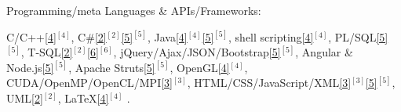 \begin{cventries}

  \cventry
    {Programming/meta Languages \& APIs/Frameworks:} %
    {} %
    {} %
    {} %
    {     
      \begin{cvitems} %
        \item {
        C/C++\ref{4}{$^{[4]}$}, 
        C\#\ref{2}{$^{[2]}$}\ref{5}{$^{[5]}$}, 
        Java\ref{4}{$^{[4]}$}\ref{5}{$^{[5]}$}, 
        shell scripting\ref{4}{$^{[4]}$}, 
        PL/SQL\ref{5}{$^{[5]}$}, 
        T-SQL\ref{2}{$^{[2]}$}\ref{6}{$^{[6]}$},  
        jQuery/Ajax/JSON/Bootstrap\ref{5}{$^{[5]}$},  
        Angular %
        \& Node.js\ref{5}{$^{[5]}$},
        Apache Struts\ref{5}{$^{[5]}$},
        OpenGL\ref{4}{$^{[4]}$},      
        CUDA/OpenMP/OpenCL/MPI\ref{3}{$^{[3]}$},
        HTML/CSS/JavaScript/XML\ref{3}{$^{[3]}$}\ref{5}{$^{[5]}$}, 
        UML\ref{2}{$^{[2]}$},
        LaTeX\ref{4}{$^{[4]}$}%
		.}
	  \end{cvitems}
    }  
  \vspace{-0.4cm}


\end{cventries}
